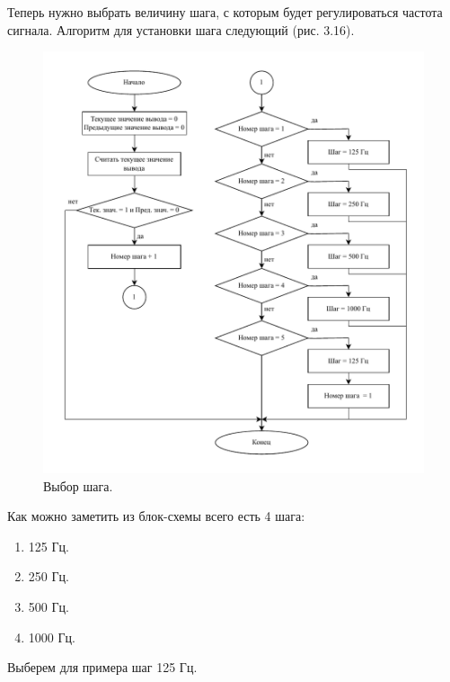 	Теперь нужно выбрать величину шага, с которым будет регулироваться частота сигнала. Алгоритм для установки шага следующий (рис. 3.16).
	
	\begin{figure}[H]
    \centering
    \includegraphics[width=1\textwidth]{../image/step_select.pdf}
    \caption{Выбор шага.}
	\end{figure}	
	
	Как можно заметить из блок-схемы всего есть 4 шага:
	\begin{enumerate}
		\item 125 Гц.
		\item 250 Гц.
		\item 500 Гц.
		\item 1000 Гц.
	\end{enumerate}
	
	Выберем для примера шаг 125 Гц.
	
